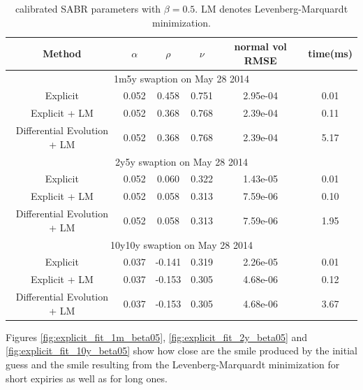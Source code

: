 \documentclass[]{rAMF2e}
\begin{document}
\begin{table}[h]
\begin{center}
\caption{\label{tbl:normal_sabr_fit}calibrated SABR parameters with $\beta=0.5$. LM denotes Levenberg-Marquardt minimization.}
\begin{tabular}{c c c c c c}
\hline
Method & $\alpha$ & $\rho$ &$\nu$ & normal vol RMSE & time(ms) \\
\hline
\multicolumn{6}{c}{1m5y swaption on May 28 2014}\\
\hline
Explicit & 0.052 & 0.458 & 0.751 & 2.95e-04 & 0.01 \\
Explicit + LM  & 0.052 & 0.368 & 0.768 & 2.39e-04 & 0.11\\
Differential Evolution + LM  & 0.052 & 0.368 & 0.768 & 2.39e-04 & 5.17 \\
\hline
\multicolumn{6}{c}{2y5y swaption on May 28 2014}\\
\hline
Explicit & 0.052 & 0.060 & 0.322 & 1.43e-05 & 0.01 \\
Explicit + LM & 0.052 & 0.058 & 0.313 & 7.59e-06 & 0.10\\
Differential Evolution + LM & 0.052 & 0.058 & 0.313 & 7.59e-06 & 1.95\\
\hline
\multicolumn{6}{c}{10y10y swaption on May 28 2014}\\
\hline
Explicit & 0.037 & -0.141 & 0.319 & 2.26e-05 & 0.01 \\
Explicit + LM  & 0.037 & -0.153 & 0.305 & 4.68e-06 & 0.12\\
Differential Evolution + LM  & 0.037 & -0.153 & 0.305 & 4.68e-06 & 3.67\\
\hline
\end{tabular}
\end{center}
\end{table}
Figures \ref{fig:explicit_fit_1m_beta05}, \ref{fig:explicit_fit_2y_beta05} and \ref{fig:explicit_fit_10y_beta05} show how close are the smile produced by the initial guess and the smile resulting from the Levenberg-Marquardt minimization for short expiries as well as for long ones.
\end{document}
